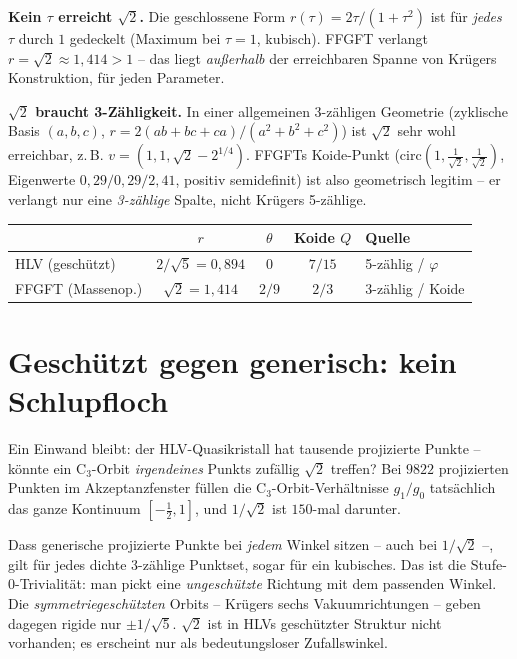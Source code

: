 \textbf{Kein $\tau$ erreicht $\sqrt2$.} Die geschlossene Form $r(\tau)=2\tau/(1+\tau^2)$
ist für \emph{jedes} $\tau$ durch $1$ gedeckelt (Maximum bei $\tau=1$, kubisch).
FFGFT verlangt $r=\sqrt2\approx1{,}414>1$ -- das liegt \emph{außerhalb} der
erreichbaren Spanne von Krügers Konstruktion, für jeden Parameter.

\textbf{$\sqrt2$ braucht 3-Zähligkeit.} In einer allgemeinen 3-zähligen Geometrie
(zyklische Basis $(a,b,c)$, $r=2(ab+bc+ca)/(a^2+b^2+c^2)$) ist $\sqrt2$ sehr wohl
erreichbar, z.\,B. $v=(1,1,\sqrt2-2^{1/4})$. FFGFTs Koide-Punkt
($\mathrm{circ}(1,\tfrac1{\sqrt2},\tfrac1{\sqrt2})$, Eigenwerte $0{,}29/0{,}29/2{,}41$,
positiv semidefinit) ist also geometrisch legitim -- er verlangt nur eine
\emph{3-zählige} Spalte, nicht Krügers 5-zählige.

\begin{center}
\begin{tabular}{lcccl}
\toprule
 & $r$ & $\theta$ & Koide $Q$ & Quelle \\
\midrule
HLV (geschützt) & $2/\sqrt5=0{,}894$ & $0$ & $7/15$ & 5-zählig / $\varphi$ \\
FFGFT (Massenop.) & $\sqrt2=1{,}414$ & $2/9$ & $2/3$ & 3-zählig / Koide \\
\bottomrule
\end{tabular}
\end{center}

\section{Geschützt gegen generisch: kein Schlupfloch}

Ein Einwand bleibt: der HLV-Quasikristall hat tausende projizierte Punkte --
könnte ein C$_3$-Orbit \emph{irgendeines} Punkts zufällig $\sqrt2$ treffen? Bei
$9822$ projizierten Punkten im Akzeptanzfenster füllen die C$_3$-Orbit-Verhältnisse
$g_1/g_0$ tatsächlich das ganze Kontinuum $[-\tfrac12,1]$, und $1/\sqrt2$ ist
$150$-mal darunter.

\begin{warningboxenv}
Dass generische projizierte Punkte bei \emph{jedem} Winkel sitzen -- auch bei
$1/\sqrt2$ --, gilt für jedes dichte 3-zählige Punktset, sogar für ein kubisches.
Das ist die Stufe-0-Trivialität: man pickt eine \emph{ungeschützte} Richtung mit
dem passenden Winkel. Die \emph{symmetriegeschützten} Orbits -- Krügers sechs
Vakuumrichtungen -- geben dagegen rigide nur $\pm1/\sqrt5$. $\sqrt2$ ist in HLVs
geschützter Struktur nicht vorhanden; es erscheint nur als bedeutungsloser
Zufallswinkel.
\end{warningboxenv}


